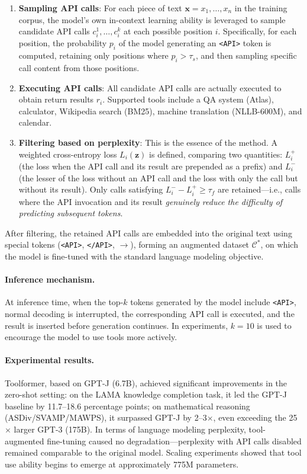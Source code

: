 \begin{enumerate}[leftmargin=*]
  \item \textbf{Sampling API calls}: For each piece of text $\mathbf{x} = x_1, \ldots, x_n$ in the training corpus, the model's own in-context learning ability is leveraged to sample candidate API calls $c_i^1, \ldots, c_i^k$ at each possible position $i$. Specifically, for each position, the probability $p_i$ of the model generating an \texttt{<API>} token is computed, retaining only positions where $p_i > \tau_s$, and then sampling specific call content from those positions.

  \item \textbf{Executing API calls}: All candidate API calls are actually executed to obtain return results $r_i$. Supported tools include a QA system (Atlas), calculator, Wikipedia search (BM25), machine translation (NLLB-600M), and calendar.

  \item \textbf{Filtering based on perplexity}: This is the essence of the method. A weighted cross-entropy loss $L_i(\mathbf{z})$ is defined, comparing two quantities: $L_i^+$ (the loss when the API call and its result are prepended as a prefix) and $L_i^-$ (the lesser of the loss without an API call and the loss with only the call but without its result). Only calls satisfying $L_i^- - L_i^+ \geq \tau_f$ are retained---i.e., calls where the API invocation and its result \emph{genuinely reduce the difficulty of predicting subsequent tokens}.
\end{enumerate}

After filtering, the retained API calls are embedded into the original text using special tokens (\texttt{<API>}, \texttt{</API>}, \texttt{$\rightarrow$}), forming an augmented dataset $\mathcal{C}^*$, on which the model is fine-tuned with the standard language modeling objective.

\paragraph{Inference mechanism.} At inference time, when the top-$k$ tokens generated by the model include \texttt{<API>}, normal decoding is interrupted, the corresponding API call is executed, and the result is inserted before generation continues. In experiments, $k=10$ is used to encourage the model to use tools more actively.

\paragraph{Experimental results.} Toolformer, based on GPT-J (6.7B), achieved significant improvements in the zero-shot setting: on the LAMA knowledge completion task, it led the GPT-J baseline by 11.7--18.6 percentage points; on mathematical reasoning (ASDiv/SVAMP/MAWPS), it surpassed GPT-J by 2--3$\times$, even exceeding the 25$\times$ larger GPT-3 (175B). In terms of language modeling perplexity, tool-augmented fine-tuning caused no degradation---perplexity with API calls disabled remained comparable to the original model. Scaling experiments showed that tool use ability begins to emerge at approximately 775M parameters.

